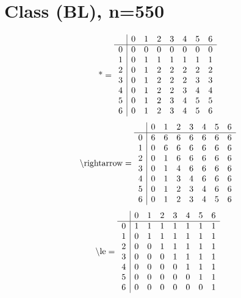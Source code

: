 \documentclass[11pt]{article}
\begin{document}
\section{Class (BL), n=550}
\[\text{*} = 
\begin{array}{r | r r r r r r r}
 & 0 & 1 & 2 & 3 & 4 & 5 & 6 \\ \hline
0 & 0 & 0 & 0 & 0 & 0 & 0 & 0 \\
1 & 0 & 1 & 1 & 1 & 1 & 1 & 1 \\
2 & 0 & 1 & 2 & 2 & 2 & 2 & 2 \\
3 & 0 & 1 & 2 & 2 & 2 & 3 & 3 \\
4 & 0 & 1 & 2 & 2 & 3 & 4 & 4 \\
5 & 0 & 1 & 2 & 3 & 4 & 5 & 5 \\
6 & 0 & 1 & 2 & 3 & 4 & 5 & 6 \\
\end{array}
\]
\[\text{\textbackslash rightarrow} = 
\begin{array}{r | r r r r r r r}
 & 0 & 1 & 2 & 3 & 4 & 5 & 6 \\ \hline
0 & 6 & 6 & 6 & 6 & 6 & 6 & 6 \\
1 & 0 & 6 & 6 & 6 & 6 & 6 & 6 \\
2 & 0 & 1 & 6 & 6 & 6 & 6 & 6 \\
3 & 0 & 1 & 4 & 6 & 6 & 6 & 6 \\
4 & 0 & 1 & 3 & 4 & 6 & 6 & 6 \\
5 & 0 & 1 & 2 & 3 & 4 & 6 & 6 \\
6 & 0 & 1 & 2 & 3 & 4 & 5 & 6 \\
\end{array}
\]
\[\text{\textbackslash le} = 
\begin{array}{r | r r r r r r r}
 & 0 & 1 & 2 & 3 & 4 & 5 & 6 \\ \hline
0 & 1 & 1 & 1 & 1 & 1 & 1 & 1 \\
1 & 0 & 1 & 1 & 1 & 1 & 1 & 1 \\
2 & 0 & 0 & 1 & 1 & 1 & 1 & 1 \\
3 & 0 & 0 & 0 & 1 & 1 & 1 & 1 \\
4 & 0 & 0 & 0 & 0 & 1 & 1 & 1 \\
5 & 0 & 0 & 0 & 0 & 0 & 1 & 1 \\
6 & 0 & 0 & 0 & 0 & 0 & 0 & 1 \\
\end{array}
\]
\end{document}
